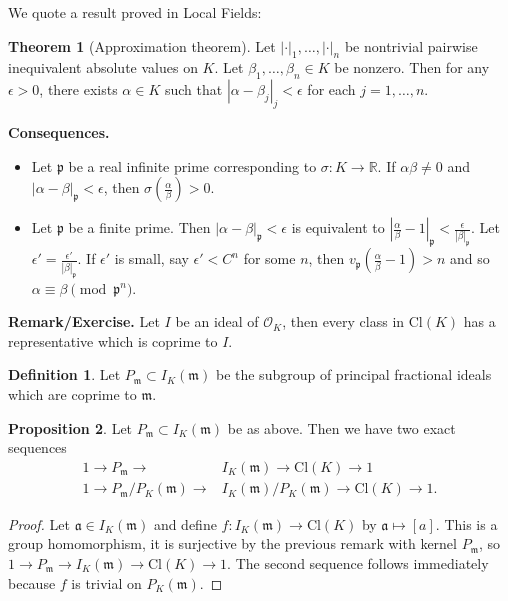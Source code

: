 \documentclass{article}
\theoremstyle{definition}
\newtheorem{theorem}{Theorem}[section]
\newtheorem{prop}[theorem]{Proposition}
\newtheorem{defn}{Definition}[section]
\begin{document}
\vspace{1mm}
 
We quote a result proved in Local Fields:
\begin{theorem}[Approximation theorem]
    Let $|\cdot|_1,\ldots,|\cdot|_n$ be nontrivial pairwise inequivalent absolute values on $K$. Let $\beta_1,\ldots,\beta_n \in K$ be nonzero. Then for any $\epsilon>0$, there exists $\alpha \in K$ such that $|\alpha-\beta_j|_j <\epsilon$ for each $j = 1,\ldots,n$.
\end{theorem}
\textbf{Consequences.} 
\begin{itemize}
    \item Let $\mathfrak{p}$ be a real infinite prime corresponding to $\sigma : K \to \mathbb{R}$. If $\alpha \beta \neq 0$ and $|\alpha-\beta|_{\mathfrak{p}}<\epsilon$, then $\sigma \left(\frac{\alpha}{\beta}\right) > 0$.
    \item Let $\mathfrak{p}$ be a finite prime. Then $|\alpha-\beta|_{\mathfrak{p}}<\epsilon$ is equivalent to $\left|\frac{\alpha}{\beta}-1 \right|_{\mathfrak{p}} < \frac{\epsilon}{|\beta|_{\mathfrak{p}}}$. Let $\epsilon' = \frac{\epsilon'}{|\beta|_{\mathfrak{p}}}$. If $\epsilon'$ is small, say $\epsilon' < C^n$ for some $n$, then $v_{\mathfrak{p}}\left(\frac{\alpha}{\beta}-1\right) > n$ and so $\alpha \equiv  \beta \pmod{\mathfrak{p}^n}$.
\end{itemize}
\textbf{Remark/Exercise.} Let $I$ be an ideal of $\mathcal{O}_K$, then every class in $\text{Cl}(K)$ has a representative which is coprime to $I$.
\begin{defn}
    Let $P_{\mathfrak{m}} \subset I_K(\mathfrak{m})$ be the subgroup of principal fractional ideals which are coprime to $\mathfrak{m}$.
\end{defn}
\begin{prop}\label{prop1.5}
    Let $P_{\mathfrak{m}} \subset I_K(\mathfrak{m})$ be as above. Then we have two exact sequences
    \begin{align*}
        1 \to P_{\mathfrak{m}} \to &I_K(\mathfrak{m}) \to \text{Cl}(K) \to 1\\
        1 \to P_{\mathfrak{m}}/P_K(\mathfrak{m}) \to &I_K(\mathfrak{m})/P_K(\mathfrak{m}) \to \text{Cl}(K) \to 1.
    \end{align*}
\end{prop}
\begin{proof}
    Let $\mathfrak{a} \in I_K(\mathfrak{m})$ and define $f: I_K(\mathfrak{m}) \to \text{Cl}(K)$ by $\mathfrak{a}\mapsto [a]$. This is a group homomorphism, it is surjective by the previous remark with kernel $P_{\mathfrak{m}}$, so $1 \to P_{\mathfrak{m}} \to I_K(\mathfrak{m}) \to \text{Cl}(K) \to 1$. The second sequence follows immediately because $f$ is trivial on $P_K(\mathfrak{m})$.
\end{proof}
\end{document}

